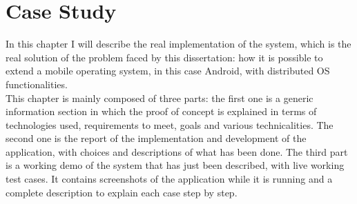 %
%
\chapter{Case Study}
%
\label{cap:proofofconcept}
%
In this chapter I will describe the real implementation of the system, which is the real solution of the problem faced by this dissertation: how it is possible to extend a mobile operating system, in this case Android, with distributed OS functionalities.\\
This chapter is mainly composed of three parts: the first one is a generic information section in which the proof of concept is explained in terms of technologies used, requirements to meet, goals and various technicalities. The second one is the report of the implementation and development of the application, with choices and descriptions of what has been done. The third part is a working demo of the system that has just been described, with live working test cases. It contains screenshots of the application while it is running and a complete description to explain each case step by step.
